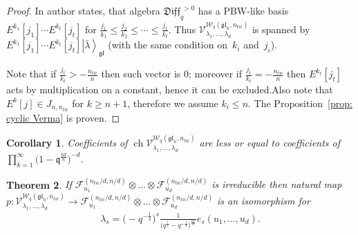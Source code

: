 \documentclass[pdftex]{sigma}
\numberwithin{equation}{section}
\newtheorem{Theorem}{Theorem}[section]
\newtheorem{Corollary}[Theorem]{Corollary}
\theoremstyle{definition}
\newcommand{\qD}{\mathfrak{Diff}_q}
\newcommand{ \twWgl }{ \mathcal{W}_{q} ( \mathfrak{gl}_n, n_{tw} ) }
\newcommand{\Vergl}{\mathcal{V}^{\twWgl}_{\lambda_1, \dots, \lambda_d} }
\newcommand{\vacgl}{\left|\bar{\lambda} \right\rangle_{\mathfrak{gl}} }
\DeclareMathOperator{\ch}{ch}
\begin{document}
\begin{proof}
In \cite[(3.48)]{N17} author states, that algebra $\qD^{\ > 0}$ has a PBW-like basis $E^{k_1}[j_1] \cdots E^{k_t}[j_t]$ for $\frac{j_1}{k_1} \leqslant \frac{j_2}{k_2} \leqslant \cdots \leqslant \frac{j_t}{k_t} $. Thus $\Vergl$ is spanned by $E^{k_1}[j_1] \cdots E^{k_t}[j_t] \vacgl$ (with the same condition on~$k_i$ and~$j_i$).

Note that if $\frac{j_t}{k_t}> -\frac{n_{tw}}{n}$ then such vector is 0; moreover if $\frac{j_t}{k_t}= -\frac{n_{tw}}{n}$ then $E^{k_t}[j_t]$ acts by multiplication on a constant, hence it can be excluded.Also note that $E^k[j] \in J_{n, n_{tw}}$ for $k \geqslant n+1$, therefore we assume $k_i \leqslant n$. The Proposition~\ref{prop: cyclic Verma} is proven.
\end{proof}

\begin{Corollary} \label{Prop:Characterless}
Coefficients of $\ch \Vergl$ are less or equal to coefficients of $\prod\limits_{k=1}^{\infty} \big(1- \mathfrak{q}^{\frac{kd}{n}} \big)^{-d} $.
\end{Corollary}

\begin{Theorem} \label{Th: Verma vs Fock}
If $\mathcal{F}^{(n_{tw}/d, n/d)}_{u_1} \otimes \dots \otimes \mathcal{F}^{(n_{tw}/d, n/d)}_{u_d}$ is irreducible then natural map $p \colon \Vergl \allowbreak \rightarrow \mathcal{F}^{(n_{tw}/d, n/d)}_{u_1} \otimes \dots \otimes \mathcal{F}^{(n_{tw}/d, n/d)}_{u_d}$ is an isomorphism for
\begin{gather} \label{eq: lambdas}
\lambda_s = \big( {-} q^{-\frac12} \big)^s \frac{1}{\big(q^{\frac12} - q^{-\frac12} \big)^{\frac{ns}{d}}} e_s (u_1, \dots, u_d).
\end{gather}
\end{Theorem}
\end{document}
